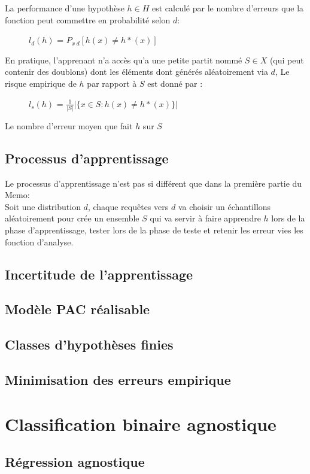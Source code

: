 La performance d'une hypothèse $h \in H$ est calculé par le nombre d'erreurs que la fonction peut commettre en probabilité selon $d$:
\begin{description}
\item[] $l_d(h)$ = $P_{x~d}[h(x) \neq h*(x)]$
\end{description}

En pratique, l'apprenant n'a accès qu'a une petite partit nommé $S \in X$ (qui peut contenir des doublons) dont les éléments dont générés aléatoirement via $d$, Le risque empirique de $h$ par rapport à $S$ est donné par :
\begin{description}
\item[] $l_s(h)$ = $\frac{1}{|S|} |\{x \in S : h(x) \neq h*(x)\}|$
\end{description}
Le nombre d'erreur moyen que fait $h$ sur $S$\\

\subsection{Processus d'apprentissage}

Le processus d'apprentissage n'est pas si différent que dans la première partie du Memo:\\

Soit une distribution $d$, chaque requêtes vers $d$ va choisir un échantillons aléatoirement pour crée un ensemble $S$ qui va servir à faire apprendre $h$ lors de la phase d'apprentissage, tester lors de la phase de teste et retenir les erreur vies les fonction d'analyse.\\

\subsection{Incertitude de l'apprentissage}
\subsection{Modèle PAC réalisable}
\subsection{Classes d'hypothèses finies}
\subsection{Minimisation des erreurs empirique}
\pagebreak
\section{Classification binaire agnostique}
\subsection{Régression agnostique}


\pagebreak

